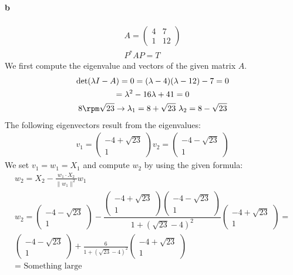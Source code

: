 \paragraph{b}
\begin{gather*}
A = \left( \begin{array}{cc}
4 & 7 \\
1 & 12 
\end{array} \right) \\
P^{*}AP = T
\end{gather*}
We first compute the eigenvalue and vectors of the given matrix $A$.
\begin{gather*}
\det( \lambda I - A ) = 0 = (\lambda - 4 ) (\lambda -12) -7 = 0 \\
= \lambda^2 - 16\lambda + 41 = 0 \\
8 \rpm \sqrt{23} \rightarrow \lambda_1 = 8 + \sqrt{23} \ \lambda_2 = 8 - \sqrt{23}
\end{gather*}
The following eigenvectors result from the eigenvalues:
\begin{gather*}
v_1 = \left( \begin{array}{c}
-4+\sqrt{23}  \\
1
\end{array} \right)
v_2 = \left( \begin{array}{c}
-4-\sqrt{23} \\
1
\end{array} \right)
\end{gather*}
We set $v_1 = w_1 = X_1$ and compute $w_2$ by using the given formula:
\begin{gather*}
w_{2}=X_{2}-\frac{w_{1}\cdot X_{2}}{\|w_{1}\|^{2}}w_{1} \\
w_2 =
\left( \begin{array}{c}
-4-\sqrt{23} \\
1
\end{array} \right)
-
\dfrac{
\left( \begin{array}{c}
-4+\sqrt{23} \\
1
\end{array} \right)
\left( \begin{array}{c}
-4-\sqrt{23}\\
1
\end{array} \right)
}{1+ \left(\sqrt{23} -4 \right)^2 } 
\left( \begin{array}{c}
-4+\sqrt{23} \\
1
\end{array} \right)
= \\
\left( \begin{array}{c}
-4-\sqrt{23} \\
1
\end{array} \right)
+ \frac{6}{1+ \left(\sqrt{23} -4 \right)^2}
\left( \begin{array}{c}
-4+\sqrt{23} \\
1
\end{array} \right)\\
= 
\text{ Something large }
\end{gather*}
